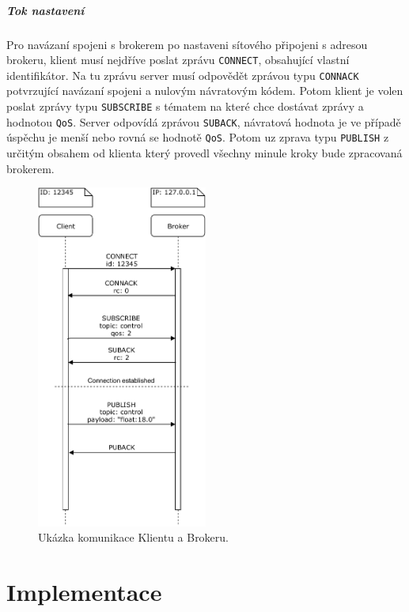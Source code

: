 \paragraph{Tok nastavení}

Pro navázaní spojeni s brokerem po nastaveni sítového připojeni s adresou brokeru, klient musí nejdříve poslat zprávu \texttt{CONNECT}, obsahující vlastní identifikátor. Na tu zprávu server musí odpovědět zprávou typu \texttt{CONNACK} potvrzující navázaní spojeni a nulovým návratovým kódem. Potom klient je volen poslat zprávy typu \texttt{SUBSCRIBE} s tématem na které chce dostávat zprávy a hodnotou \texttt{QoS}. Server odpovídá zprávou \texttt{SUBACK}, návratová hodnota je ve případě úspěchu je menší nebo rovná se hodnotě \texttt{QoS}. Potom uz zprava typu \texttt{PUBLISH} z určitým obsahem od klienta který provedl všechny minule kroky bude zpracovaná brokerem.

\begin{figure}[hbt]
  \centering
  \includegraphics[width=0.5\textwidth]{obrazky-figures/MQTT-flow.pdf}
  \caption{Ukázka komunikace Klientu a Brokeru.}
  \label{mqtt-flow}
\end{figure}

\chapter{Implementace}
\label{sec:implementation}

